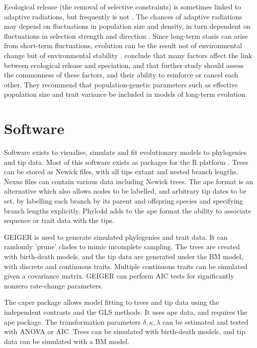 \documentclass[12pt]{article}
\begin{document}
Ecological release (the removal of selective constraints) is sometimes linked to adaptive radiations, but frequently is not \citep{yoder_ecological_2010}. 
The chances of adaptive radiations may depend on fluctuations in population size and density, in turn dependent on fluctuations in selection strength and direction \citep{siepielski_its_2009,futuyma_evolutionary_2010}. 
Since long-term stasis can arise from short-term fluctuations, evolution can be the result not of environmental change but of environmental stability \citep{futuyma_evolutionary_2010}. \citet{yoder_ecological_2010} conclude that many factors affect the link between ecological release and speciation, and that further study should assess the commonness of these factors, and their ability to reinforce or cancel each other. 
They recommend that population-genetic parameters such as effective population size and trait variance be included in models of long-term evolution.


\section{Software}

Software exists to visualise, simulate and fit evolutionary models to phylogenies and tip data. 
Most of this software exists as packages for the R platform \citep{team_r:_2005}. 
Trees can be stored as Newick files, with all tips extant and nested branch lengths. 
Nexus files can contain various data including Newick trees. 
The ape format \citep{paradis_ape:_2004}  is an alternative which also allows nodes to be labelled, and arbitrary tip dates to be set, by labelling each branch by its parent and offspring species and specifying branch lengths explicitly. 
Phylo4d \citep{hackathon_phylobase:_2011} adds to the ape format the ability to associate sequence or trait data with the tips.

GEIGER \citep{harmon_geiger:_2008} is used to generate simulated phylogenies and trait data. 
It can randomly 'prune' clades to mimic incomplete sampling. 
The trees are created with birth-death models, and the tip data are generated under the BM model, with discrete and continuous traits. 
Multiple continuous traits can be simulated given a covariance matrix. 
GEIGER can perform AIC tests for significantly nonzero rate-change parameters.

The caper package \cite{caper} allows model fitting to trees and tip data using the independent contrasts and the GLS methods. 
It uses ape data, and requires the ape package. 
The transformation parameters $\delta, \kappa, \lambda$ can be estimated and tested with ANOVA or AIC. 
Trees can be simulated with birth-death models, and tip data can be simulated with a BM model.
\end{document}
